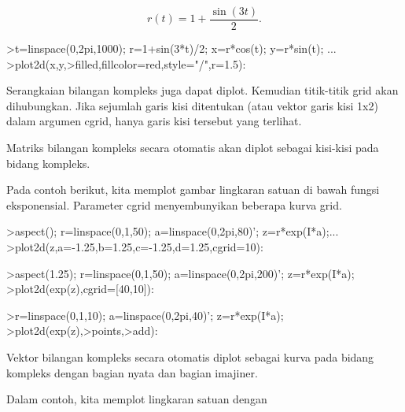 \documentclass{article}
\begin{document}
\begin{eulernotebook}
\begin{eulercomment}
\begin{eulercomment}
\begin{eulercomment}
\begin{eulercomment}
\begin{eulercomment}
\begin{eulercomment}
\begin{eulercomment}
\begin{eulercomment}
\begin{eulercomment}
\begin{eulercomment}
\begin{eulercomment}
\begin{eulercomment}
\begin{eulercomment}
\end{eulercomment}
\begin{eulerformula}
\[
r(t) = 1 + \dfrac{\sin(3t)}{2}.
\]
\end{eulerformula}
\begin{eulerprompt}
>t=linspace(0,2pi,1000); r=1+sin(3*t)/2; x=r*cos(t); y=r*sin(t); ...
>plot2d(x,y,>filled,fillcolor=red,style="/",r=1.5):
\end{eulerprompt}
\begin{eulercomment}
Serangkaian bilangan kompleks juga dapat diplot. Kemudian titik-titik
grid akan dihubungkan. Jika sejumlah garis kisi ditentukan (atau
vektor garis kisi 1x2) dalam argumen cgrid, hanya garis kisi tersebut
yang terlihat.

Matriks bilangan kompleks secara otomatis akan diplot sebagai
kisi-kisi pada bidang kompleks.

Pada contoh berikut, kita memplot gambar lingkaran satuan di bawah
fungsi eksponensial. Parameter cgrid menyembunyikan beberapa kurva
grid.
\end{eulercomment}
\begin{eulerprompt}
>aspect(); r=linspace(0,1,50); a=linspace(0,2pi,80)'; z=r*exp(I*a);...
>plot2d(z,a=-1.25,b=1.25,c=-1.25,d=1.25,cgrid=10):
\end{eulerprompt}
\begin{eulerprompt}
>aspect(1.25); r=linspace(0,1,50); a=linspace(0,2pi,200)'; z=r*exp(I*a);
>plot2d(exp(z),cgrid=[40,10]):
\end{eulerprompt}
\begin{eulerprompt}
>r=linspace(0,1,10); a=linspace(0,2pi,40)'; z=r*exp(I*a);
>plot2d(exp(z),>points,>add):
\end{eulerprompt}
\begin{eulercomment}
Vektor bilangan kompleks secara otomatis diplot sebagai kurva pada
bidang kompleks dengan bagian nyata dan bagian imajiner.

Dalam contoh, kita memplot lingkaran satuan dengan


\end{eulercomment}
\end{eulercomment}
\end{eulercomment}
\end{eulercomment}
\end{eulercomment}
\end{eulercomment}
\end{eulercomment}
\end{eulercomment}
\end{eulercomment}
\end{eulercomment}
\end{eulercomment}
\end{eulercomment}
\end{eulercomment}
\end{eulernotebook}
\end{document}

